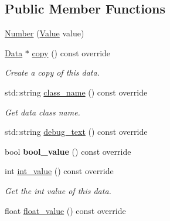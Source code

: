 \subsection*{Public Member Functions}
\begin{DoxyCompactItemize}
\item 
\hyperlink{classcreek_1_1_number_abee3a2d79d51288debe456ba0ddc1543}{Number} (\hyperlink{classcreek_1_1_number_ac7b75fc8a57a0a16fa2417b57a538a18}{Value} value)
\item 
\hyperlink{classcreek_1_1_data}{Data} $\ast$ \hyperlink{classcreek_1_1_number_a068d3a430088edcb4d496320da1b41c0}{copy} () const  override\hypertarget{classcreek_1_1_number_a068d3a430088edcb4d496320da1b41c0}{}\label{classcreek_1_1_number_a068d3a430088edcb4d496320da1b41c0}

\begin{DoxyCompactList}\small\item\em Create a copy of this data. \end{DoxyCompactList}\item 
std\+::string \hyperlink{classcreek_1_1_number_afa56ced9bf6896004c88837dd7977325}{class\+\_\+name} () const  override\hypertarget{classcreek_1_1_number_afa56ced9bf6896004c88837dd7977325}{}\label{classcreek_1_1_number_afa56ced9bf6896004c88837dd7977325}

\begin{DoxyCompactList}\small\item\em Get data class name. \end{DoxyCompactList}\item 
std\+::string \hyperlink{classcreek_1_1_number_acb6a31981f3bd3d0e43846d540301997}{debug\+\_\+text} () const  override
\item 
bool {\bfseries bool\+\_\+value} () const  override\hypertarget{classcreek_1_1_number_ad0b13e21918abb5ef344e4c9d7b88b47}{}\label{classcreek_1_1_number_ad0b13e21918abb5ef344e4c9d7b88b47}

\item 
int \hyperlink{classcreek_1_1_number_a6b945ab7531c31658a862c06e7bd6d0b}{int\+\_\+value} () const  override\hypertarget{classcreek_1_1_number_a6b945ab7531c31658a862c06e7bd6d0b}{}\label{classcreek_1_1_number_a6b945ab7531c31658a862c06e7bd6d0b}

\begin{DoxyCompactList}\small\item\em Get the int value of this data. \end{DoxyCompactList}\item 
float \hyperlink{classcreek_1_1_number_a59a66eea87ddaa2646586445435e44dd}{float\+\_\+value} () const  override\hypertarget{classcreek_1_1_number_a59a66eea87ddaa2646586445435e44dd}{}\label{classcreek_1_1_number_a59a66eea87ddaa2646586445435e44dd}


\end{DoxyCompactItemize}
